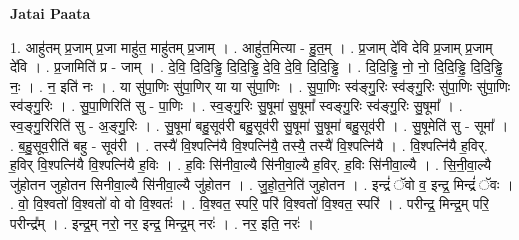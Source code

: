 \documentclass[17pt]{extarticle}
\begin{document}
\textbf{Jatai Paata} \newline

1. आहु॑तम् प्र॒जाम् प्र॒जा माहु॑त॒ माहु॑तम् प्र॒जाम् । . आहु॑त॒मित्या - हु॒त॒म् । . प्र॒जाम् दे॑वि देवि प्र॒जाम् प्र॒जाम् दे॑वि । . प्र॒जामिति॑ प्र - जाम् । . दे॒वि॒ दि॒दि॒ड्ढि॒ दि॒दि॒ड्ढि॒ दे॒वि॒ दे॒वि॒ दि॒दि॒ड्ढि॒ । . दि॒दि॒ड्ढि॒ नो॒ नो॒ दि॒दि॒ड्ढि॒ दि॒दि॒ड्ढि॒ नः॒ । . न॒ इति॑ नः । . या सु॑पा॒णिः सु॑पा॒णिर् या या सु॑पा॒णिः । . सु॒पा॒णिः स्व॑ङ्गु॒रिः स्व॑ङ्गु॒रिः सु॑पा॒णिः सु॑पा॒णिः स्व॑ङ्गु॒रिः । . सु॒पा॒णिरिति॑ सु - पा॒णिः । . स्व॒ङ्गु॒रिः सु॒षूमा॑ सु॒षूमा᳚ स्वङ्गु॒रिः स्व॑ङ्गु॒रिः सु॒षूमा᳚ । . स्व॒ङ्गु॒रिरिति॑ सु - अ॒ङ्गु॒रिः । . सु॒षूमा॑ बहु॒सूव॑री बहु॒सूव॑री सु॒षूमा॑ सु॒षूमा॑ बहु॒सूव॑री । . सु॒षूमेति॑ सु - सूमा᳚ । . ब॒हु॒सूव॒रीति॑ बहु - सूव॑री । . तस्यै॑ वि॒श्पत्नि॑यै वि॒श्पत्नि॑यै॒ तस्यै॒ तस्यै॑ वि॒श्पत्नि॑यै । . वि॒श्पत्नि॑यै ह॒विर्. ह॒विर् वि॒श्पत्नि॑यै वि॒श्पत्नि॑यै ह॒विः । . ह॒विः सि॑नीवा॒ल्यै सि॑नीवा॒ल्यै ह॒विर्. ह॒विः सि॑नीवा॒ल्यै । . सि॒नी॒वा॒ल्यै जु॑होतन जुहोतन सिनीवा॒ल्यै सि॑नीवा॒ल्यै जु॑होतन । . जु॒हो॒त॒नेति॑ जुहोतन । . इन्द्रं॑ ॅवो व॒ इन्द्र॒ मिन्द्रं॑ ॅवः । . वो॒ वि॒श्वतो॑ वि॒श्वतो॑ वो वो वि॒श्वतः॑ । . वि॒श्वत॒ स्परि॒ परि॑ वि॒श्वतो॑ वि॒श्वत॒ स्परि॑ । . परीन्द्र॒ मिन्द्र॒म् परि॒ परीन्द्र᳚म् । . इन्द्र॒म् नरो॒ नर॒ इन्द्र॒ मिन्द्र॒म् नरः॑ । . नर॒ इति॒ नरः॑ । \newline
\end{document}

